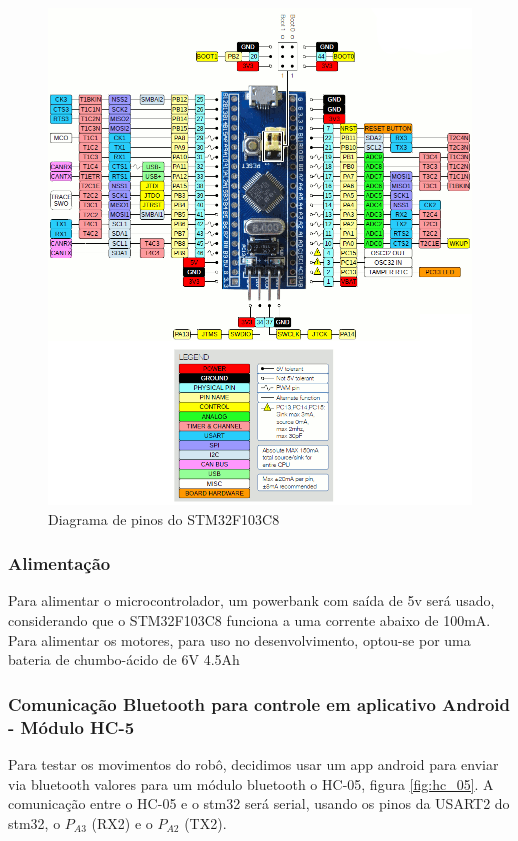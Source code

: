 \begin{figure}[htb]
	\centering
	\includegraphics[width=1.0\textwidth]{figures/stm32f1_pinout}
	\caption{Diagrama de pinos do STM32F103C8}
\end{figure}

\subsubsection{Alimentação}
Para alimentar o microcontrolador, um powerbank com saída de 5v será usado, considerando que o STM32F103C8 funciona a
uma corrente abaixo de 100mA. Para alimentar os motores, para uso no desenvolvimento, optou-se por uma bateria de chumbo-ácido de 6V 4.5Ah

\subsubsection{Comunicação Bluetooth para controle em aplicativo Android - Módulo HC-5}
Para testar os movimentos do robô, decidimos usar um app android para enviar via bluetooth valores para um módulo bluetooth o HC-05, figura \ref{fig:hc_05}.
A comunicação entre o HC-05 e o stm32 será serial, usando os pinos da USART2 do stm32, o  $P_{A3}$ (RX2) e o  $P_{A2}$ (TX2).

